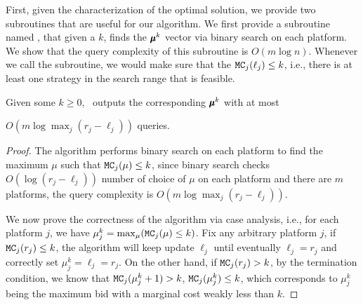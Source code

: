 First, given the characterization of the optimal solution, we provide two subroutines that are useful for our algorithm. We first provide a subroutine named \matchingmc, that given a $k$, finds the $\pmb{\mu}^k$ vector via binary search on each platform. We show that the query complexity of this subroutine is $O(m \log n)$. Whenever we call the subroutine, we would make sure that the $\texttt{MC}_j(\ell_j) \leq k$, i.e., there is at least one strategy in the search range that is feasible. 
\renewcommand*{\algorithmcfname}{SUBROUTINE}
\begin{algorithm}[h]
\DontPrintSemicolon
\LinesNumbered
\SetNoFillComment
{}
\caption{\matchingmc}
\label{sub:matchingmc}
\end{algorithm}

\begin{lemma}\label{lem:matchingmc}
Given some $k \geq 0$, \matchingmc\ outputs the corresponding $\pmb{\mu}^k$ with at most 

$O(m\log \max_j(r_j - \ell_j))$ queries. 
\end{lemma}
\begin{proof}
The algorithm performs binary search on each platform to find the maximum $\mu$ such that $\texttt{MC}_j(\mu) \leq k$, since binary search checks $O(\log (r_j - \ell_j))$ number of choice of $\mu$ on each platform and there are $m$ platforms, the query complexity is $O(m \log \max_j(r_j - \ell_j))$.

We now prove the correctness of the algorithm via case analysis, i.e., for each platform $j$, we have $\mu^k_j = \max_{\mu}(\texttt{MC}_j(\mu) \leq k)$. Fix any arbitrary platform $j$, if $\texttt{MC}_j(r_j) \leq k$, the algorithm will keep update $\ell_j$ until eventually $\ell_j = r_j$ and correctly set $\mu^k_j = \ell_j = r_j$. On the other hand, if $\texttt{MC}_j(r_j) > k$, by the termination condition, we know that $\texttt{MC}_j(\mu^k_j +1) > k$, $\texttt{MC}_j(\mu^k_j)\leq k$, which corresponds to $\mu^k_j$ being the maximum bid with a marginal cost weakly less than $k$.
\end{proof}

